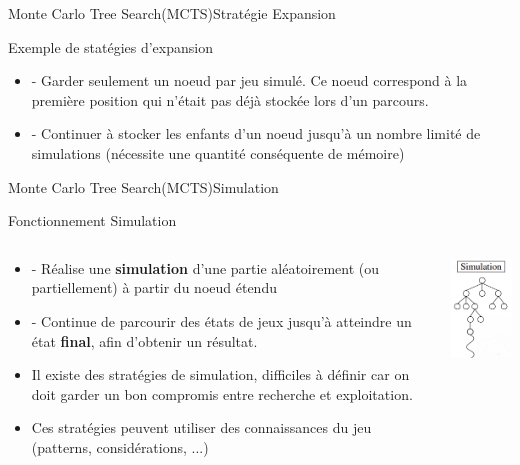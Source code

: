 \begin{frame}{Monte Carlo Tree Search(MCTS)}{Stratégie Expansion}
	\begin{block}{Exemple de statégies d'expansion}
		\begin{itemize}
			\item - Garder seulement un noeud par jeu simulé. Ce noeud correspond à la première position qui n'était pas déjà stockée lors d'un parcours.
			\item - Continuer à stocker les enfants d'un noeud jusqu'à un nombre limité de simulations (nécessite une quantité conséquente de mémoire)
		\end{itemize}
	\end{block}
\end{frame}

\begin{frame}{Monte Carlo Tree Search(MCTS)}{Simulation}
	\begin{block}{Fonctionnement Simulation}
		\begin{columns}
			\begin{column}{7cm}
				\begin{itemize}
					\item - Réalise une \textbf{simulation} d'une partie aléatoirement (ou partiellement) à partir du noeud étendu
					\item - Continue de parcourir des états de jeux jusqu'à atteindre un état \textbf{final}, afin d'obtenir un résultat.
					\item Il existe des stratégies de simulation, difficiles à définir car on doit garder un bon compromis entre recherche et exploitation.
					\item Ces stratégies peuvent utiliser des connaissances du jeu (patterns, considérations, ...)
				\end{itemize}
			\end{column}
			\begin{column}{4cm}
				\includegraphics[width=3cm]{ressources/MCTS/Simulation.png}
			\end{column}
		\end{columns}
	\end{block}
\end{frame}

